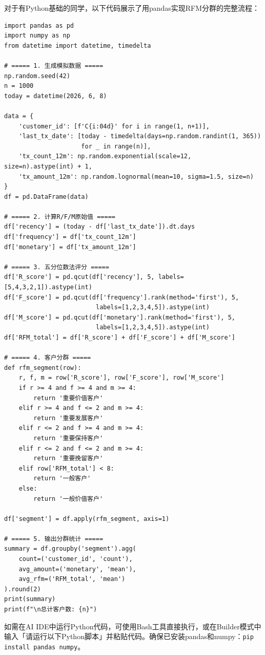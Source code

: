 对于有Python基础的同学，以下代码展示了用pandas实现RFM分群的完整流程：

\begin{lstlisting}[style=python]
import pandas as pd
import numpy as np
from datetime import datetime, timedelta

# ===== 1. 生成模拟数据 =====
np.random.seed(42)
n = 1000
today = datetime(2026, 6, 8)

data = {
    'customer_id': [f'C{i:04d}' for i in range(1, n+1)],
    'last_tx_date': [today - timedelta(days=np.random.randint(1, 365))
                     for _ in range(n)],
    'tx_count_12m': np.random.exponential(scale=12, size=n).astype(int) + 1,
    'tx_amount_12m': np.random.lognormal(mean=10, sigma=1.5, size=n)
}
df = pd.DataFrame(data)

# ===== 2. 计算R/F/M原始值 =====
df['recency'] = (today - df['last_tx_date']).dt.days
df['frequency'] = df['tx_count_12m']
df['monetary'] = df['tx_amount_12m']

# ===== 3. 五分位数法评分 =====
df['R_score'] = pd.qcut(df['recency'], 5, labels=[5,4,3,2,1]).astype(int)
df['F_score'] = pd.qcut(df['frequency'].rank(method='first'), 5,
                         labels=[1,2,3,4,5]).astype(int)
df['M_score'] = pd.qcut(df['monetary'].rank(method='first'), 5,
                         labels=[1,2,3,4,5]).astype(int)
df['RFM_total'] = df['R_score'] + df['F_score'] + df['M_score']

# ===== 4. 客户分群 =====
def rfm_segment(row):
    r, f, m = row['R_score'], row['F_score'], row['M_score']
    if r >= 4 and f >= 4 and m >= 4:
        return '重要价值客户'
    elif r >= 4 and f <= 2 and m >= 4:
        return '重要发展客户'
    elif r <= 2 and f >= 4 and m >= 4:
        return '重要保持客户'
    elif r <= 2 and f <= 2 and m >= 4:
        return '重要挽留客户'
    elif row['RFM_total'] < 8:
        return '一般客户'
    else:
        return '一般价值客户'

df['segment'] = df.apply(rfm_segment, axis=1)

# ===== 5. 输出分群统计 =====
summary = df.groupby('segment').agg(
    count=('customer_id', 'count'),
    avg_amount=('monetary', 'mean'),
    avg_rfm=('RFM_total', 'mean')
).round(2)
print(summary)
print(f"\n总计客户数: {n}")
\end{lstlisting}

\begin{notebox}[Python环境说明]
如需在AI IDE中运行Python代码，可使用Bash工具直接执行，或在Builder模式中输入「请运行以下Python脚本」并粘贴代码。确保已安装pandas和numpy：\texttt{pip install pandas numpy}。
\end{notebox}

